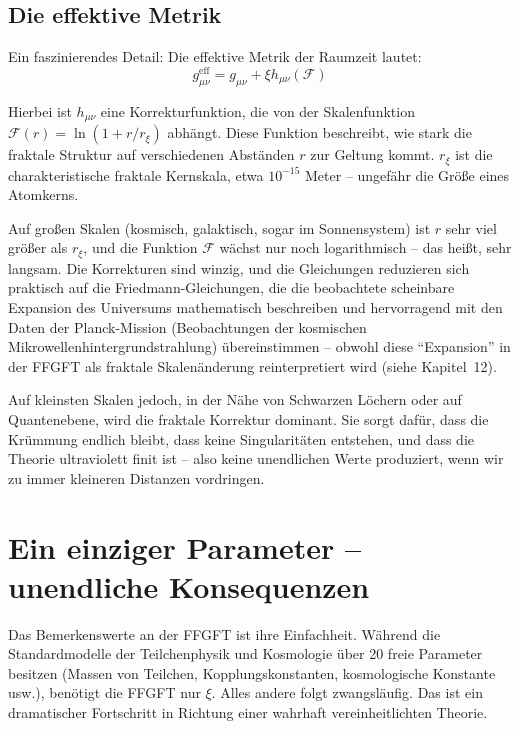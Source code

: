 \subsection{Die effektive Metrik}

Ein faszinierendes Detail: Die effektive Metrik der Raumzeit lautet:
\begin{equation}
g_{\mu\nu}^{\text{eff}} = g_{\mu\nu} + \xi h_{\mu\nu}(\mathcal{F})
\end{equation}

Hierbei ist $h_{\mu\nu}$ eine Korrekturfunktion, die von der Skalenfunktion $\mathcal{F}(r) = \ln(1 + r/r_\xi)$ abhängt. Diese Funktion beschreibt, wie stark die fraktale Struktur auf verschiedenen Abständen $r$ zur Geltung kommt. $r_\xi$ ist die charakteristische fraktale Kernskala, etwa $10^{-15}$ Meter – ungefähr die Größe eines Atomkerns.

Auf großen Skalen (kosmisch, galaktisch, sogar im Sonnensystem) ist $r$ sehr viel größer als $r_\xi$, und die Funktion $\mathcal{F}$ wächst nur noch logarithmisch – das heißt, sehr langsam. Die Korrekturen sind winzig, und die Gleichungen reduzieren sich praktisch auf die Friedmann-Gleichungen, die die beobachtete scheinbare Expansion des Universums mathematisch beschreiben und hervorragend mit den Daten der Planck-Mission (Beobachtungen der kosmischen Mikrowellenhintergrundstrahlung) übereinstimmen – obwohl diese \enquote{Expansion} in der FFGFT als fraktale Skalenänderung reinterpretiert wird (siehe Kapitel~12).

Auf kleinsten Skalen jedoch, in der Nähe von Schwarzen Löchern oder auf Quantenebene, wird die fraktale Korrektur dominant. Sie sorgt dafür, dass die Krümmung endlich bleibt, dass keine Singularitäten entstehen, und dass die Theorie ultraviolett finit ist – also keine unendlichen Werte produziert, wenn wir zu immer kleineren Distanzen vordringen.

\section{Ein einziger Parameter – unendliche Konsequenzen}

Das Bemerkenswerte an der FFGFT ist ihre Einfachheit. Während die Standardmodelle der Teilchenphysik und Kosmologie über 20 freie Parameter besitzen (Massen von Teilchen, Kopplungskonstanten, kosmologische Konstante usw.), benötigt die FFGFT nur $\xi$. Alles andere folgt zwangsläufig. Das ist ein dramatischer Fortschritt in Richtung einer wahrhaft vereinheitlichten Theorie.

